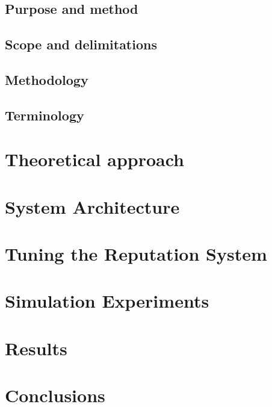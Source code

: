 \documentclass[a4paper,11pt]{kth-mag}
\begin{document}
\subsection*{Purpose and method}

\subsection*{Scope and delimitations}

\subsection*{Methodology}

\subsection*{Terminology}


\section{Theoretical approach}

\newpage
\section{System Architecture}

\section{Tuning the Reputation System} \label{tab:system}

\newpage
\section{Simulation Experiments}

\section{Results}

\section{Conclusions}

\
\begin{comment}
\begin{figure}[ht]
\begin{center}
And here is a figure 
\caption{\small{Several statements describing the same resource.}}\label{RDF_4}
\end{center}
\end{figure}


that we refer to here: \ref{RDF_4}
\end{comment}
\printbibliography
\end{document}
